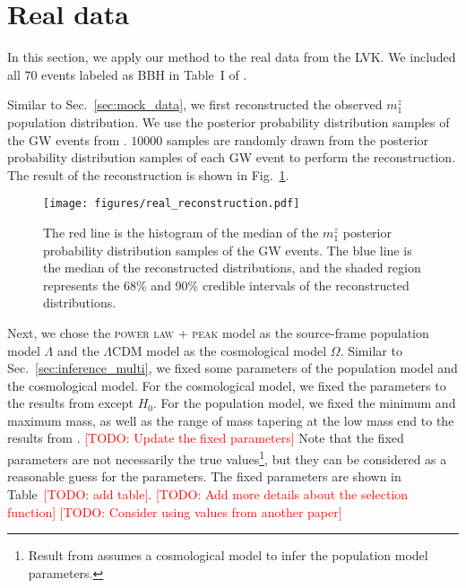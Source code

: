 \documentclass[sn-aps, pdflatex]{sn-jnl}
\newcommand{\todo}[1]{\textcolor{red}{[TODO: #1]}}
\begin{document}
\section{Real data}
\label{sec:real_data}

In this section, we apply our method to the real data from the \ac{LVK}.
We included all $70$ events labeled as BBH in Table~I of \cite{KAGRA:2021duu}.

Similar to Sec.~\ref{sec:mock_data}, we first reconstructed the observed $m^z_1$ population distribution.
We use the posterior probability distribution samples of the \ac{GW} events from \cite{LIGOScientific:2019lzm, KAGRA:2023pio}.
$10000$ samples are randomly drawn from the posterior probability distribution samples of each \ac{GW} event to perform the reconstruction.
The result of the reconstruction is shown in Fig.~\ref{fig:real_reconstruction}.
\begin{figure}[htbp]
    \texttt{[image: figures/real\_reconstruction.pdf]}
    \caption{
        The red line is the histogram of the median of the $m^z_1$ posterior probability distribution samples of the \ac{GW} events.
        The blue line is the median of the reconstructed distributions, and the shaded region represents the 68\% and 90\% credible intervals of the reconstructed distributions.
    }
    \label{fig:real_reconstruction}
\end{figure}

Next, we chose the \textsc{power law + peak} model as the source-frame population model $\Lambda$ and the $\Lambda$CDM model as the cosmological model $\Omega$.
Similar to Sec.~\ref{sec:inference_multi}, we fixed some parameters of the population model and the cosmological model.
For the cosmological model, we fixed the parameters to the results from \cite{Planck:2018vyg} except $H_0$.
For the population model, we fixed the minimum and maximum mass, as well as the range of mass tapering at the low mass end to the results from \cite{KAGRA:2021duu}.
\todo{Update the fixed parameters}
Note that the fixed parameters are not necessarily the true values\footnote{Result from \cite{KAGRA:2021duu} assumes a cosmological model to infer the population model parameters.}, but they can be considered as a reasonable guess for the parameters.
The fixed parameters are shown in Table~\todo{add table}.
\todo{Add more details about the selection function}
\todo{Consider using values from another paper}
\end{document}
